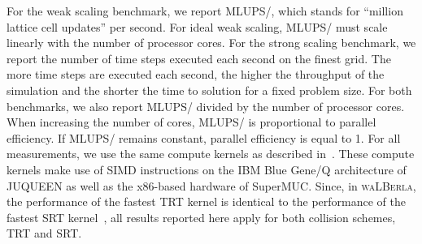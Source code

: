 \documentclass[final,leqno,onefignum,onetabnum]{siamltex1213}
\newcommand{\Walberla}{\textsc{waLBerla}}
\newcommand{\MLUPSPS}{\mbox{MLUPS/}}
\newcommand{\MLUPSPSC}{\mbox{MLUPS\hspace{.08em}/\hspace{.08em}}}
\begin{document}
For the weak scaling benchmark, we report \MLUPSPS{}, which stands for ``million lattice cell updates'' per second.
For ideal weak scaling, \MLUPSPS{} must scale linearly with the number of processor cores.
For the strong scaling benchmark, we report the number of time steps executed each second on the finest grid.
The more time steps are executed each second, the higher the throughput of the simulation and the shorter the time to solution for a fixed problem size.
For both benchmarks, we also report \MLUPSPS{} divided by the number of processor cores.
When increasing the number of cores, \MLUPSPSC{} is proportional to parallel efficiency.
If \MLUPSPSC{} remains constant, parallel efficiency is equal to 1.
For all measurements, we use the same compute kernels as described in~\cite{Godenschwager2013}.
These compute kernels make use of SIMD instructions on the IBM Blue Gene/Q architecture of JUQUEEN as well as the x86-based hardware of SuperMUC.
Since, in \Walberla{}, the performance of the fastest TRT kernel is identical to the performance of the fastest SRT kernel~\cite{Godenschwager2013},
all results reported here apply for both collision schemes, TRT and SRT.
\end{document}
